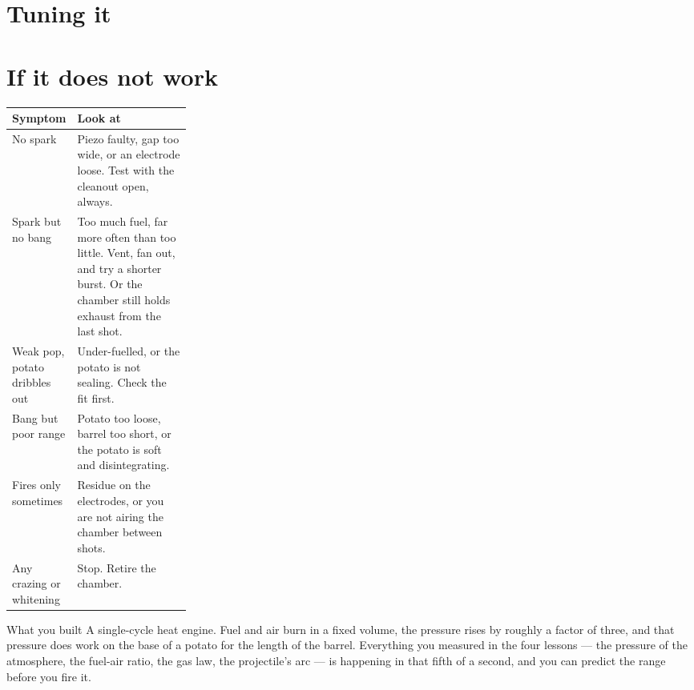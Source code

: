 \section{Tuning it}
\begin{telosfacts}[0.20]
\end{telosfacts}

\section{If it does not work}
\begin{tabularx}{\linewidth}{@{}p{0.26\linewidth}L@{}}
\toprule
\textbf{Symptom} & \textbf{Look at}\\
\midrule
No spark & Piezo faulty, gap too wide, or an electrode loose. Test with the cleanout open, always.\\
Spark but no bang & Too much fuel, far more often than too little. Vent, fan out, and try a shorter burst. Or the chamber still holds exhaust from the last shot.\\
Weak pop, potato dribbles out & Under-fuelled, or the potato is not sealing. Check the fit first.\\
Bang but poor range & Potato too loose, barrel too short, or the potato is soft and disintegrating.\\
Fires only sometimes & Residue on the electrodes, or you are not airing the chamber between shots.\\
Any crazing or whitening & Stop. Retire the chamber. \\
\bottomrule
\end{tabularx}

\begin{telospanel}{What you built}
A single-cycle heat engine. Fuel and air burn in a fixed volume, the pressure
rises by roughly a factor of three, and that pressure does work on the base of a
potato for the length of the barrel. Everything you measured in the four lessons
--- the pressure of the atmosphere, the fuel-air ratio, the gas law, the
projectile's arc --- is happening in that fifth of a second, and you can predict
the range before you fire it.
\end{telospanel}

